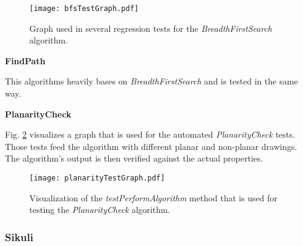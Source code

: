 \begin{figure}[!h]
	\centering
	\texttt{[image: bfsTestGraph.pdf]}
	\caption{Graph used in several regression tests for the \emph{BreadthFirstSearch} algorithm.}
	\label{img:bfsTestGraph}
\end{figure}

\pagebreak
\textbf{FindPath}\par
This algorithms heavily bases on \emph{BreadthFirstSearch} and is tested in the same way.\par

\textbf{PlanarityCheck}\par
Fig. \ref{img:planarityTestGraph} visualizes a graph that is used for the automated \emph{PlanarityCheck} tests. Those tests feed the algorithm with different planar and non-planar drawings. The algorithm's output is then verified against the actual properties.\par

\begin{figure}[!h]
	\centering
	\texttt{[image: planarityTestGraph.pdf]}
	\caption{Visualization of the \emph{testPerformAlgorithm} method that is used for testing the \emph{PlanarityCheck} algorithm.}
	\label{img:planarityTestGraph}
\end{figure}


\subsubsection{Sikuli}

